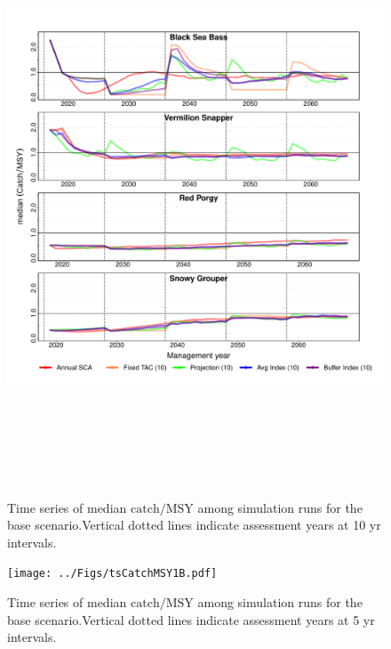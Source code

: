 \documentclass[12pt,english]{article}
\begin{document}
\begin{figure}[!ht]
\begin{center}
\includegraphics[width=6in, height=7in]{../Figs/tsCatchMSY1.pdf}
\end{center}
\begin{flushleft}
\caption{Time series of median $\mathrm{catch/MSY}$ among simulation runs for the base scenario.Vertical dotted lines indicate assessment years at 10 yr intervals.}
\label{fig:tsCatchMSY1}
\end{flushleft}
\end{figure}
\clearpage\begin{figure}[!ht]
\begin{center}
\texttt{[image: ../Figs/tsCatchMSY1B.pdf]}
\end{center}
\begin{flushleft}
\caption{Time series of median $\mathrm{catch/MSY}$ among simulation runs for the base scenario.Vertical dotted lines indicate assessment years at 5 yr intervals.}
\label{fig:tsCatchMSY1B}
\end{flushleft}
\end{figure}
\end{document}
